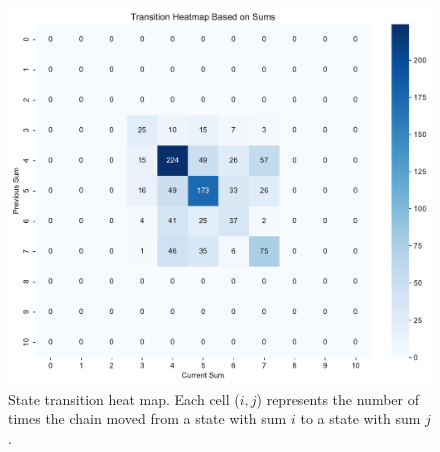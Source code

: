 \begin{figure}
    \centering
    \includegraphics[width=\linewidth]{data/05_reporting/problem_set_2/transition_heatmap.pdf}
    \caption{State transition heat map. Each cell ($i, j$) represents the number of times the chain moved from a state with sum $i$ to a state with sum $j$.}
    \label{fig:enter-label}
\end{figure}